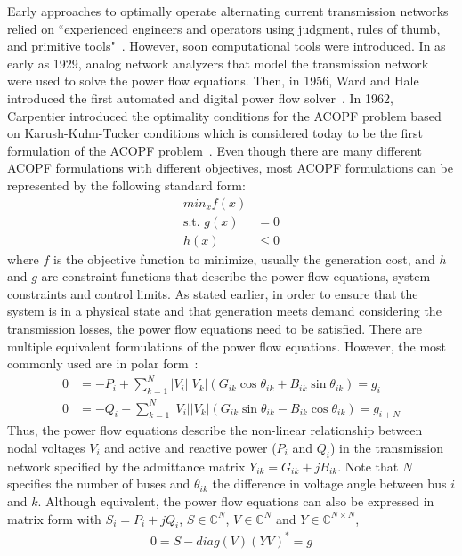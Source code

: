 \documentclass[11pt]{cmuthesis} %
\begin{document}
Early approaches to optimally operate alternating current transmission networks relied on ``experienced engineers and operators using judgment, rules of thumb, and primitive tools"~\cite{cain2012history}. However, soon computational tools were introduced. In as early as 1929, analog network analyzers that model the transmission network were used to solve the power flow equations\cite{cain2012history}. Then, in 1956, Ward and Hale introduced the first automated and digital power flow solver~\cite{hale1956digital}. In 1962, Carpentier introduced the optimality conditions for the ACOPF problem based on Karush-Kuhn-Tucker conditions which is considered today to be the first formulation of the ACOPF problem~\cite{carpentier1962contribution}. Even though there are many different ACOPF formulations with different objectives, most ACOPF formulations can be represented by the following standard form:
\begin{align*}
min_x f(x)\\
\text{s.t. } g(x) &= 0\\
h(x) &\leq 0
\end{align*}
where $f$ is the objective function to minimize, usually the generation cost, and $h$ and $g$ are constraint functions that describe the power flow equations, system constraints and control limits. As stated earlier, in order to ensure that the system is in a physical state and that generation meets demand considering the transmission losses, the power flow equations need to be satisfied. There are multiple equivalent formulations of the power flow equations. However, the most commonly used are in polar form~\cite{schaffer1988nondiverging}:
\begin{align*}
0&=-P_{{i}}+\sum _{{k=1}}^{N}|V_{i}||V_{k}|(G_{{ik}}\cos \theta _{{ik}}+B_{{ik}}\sin \theta _{{ik}}) = g_i\\
0&=-Q_{{i}}+\sum _{{k=1}}^{N}|V_{i}||V_{k}|(G_{{ik}}\sin \theta _{{ik}}-B_{{ik}}\cos \theta _{{ik}}) = g_{i+N}
\end{align*}
Thus, the power flow equations describe the non-linear relationship between nodal voltages $V_i$ and active and reactive power ($P_i$ and $Q_i$) in the transmission network specified by the admittance matrix $Y_{ik} = G_{ik} + jB_{ik}$. Note that $N$ specifies the number of buses and $\theta _{{ik}}$ the difference in voltage angle between bus $i$ and $k$. Although equivalent, the power flow equations can also be expressed in matrix form with $S_i = P_i + jQ_i$, $S \in \mathbb{C}^N$, $V \in \mathbb{C}^N$ and $Y \in \mathbb{C}^{N \times N}$,
\begin{align*}
0 = S - diag(V)(YV)^* = g
\end{align*}
\end{document}
